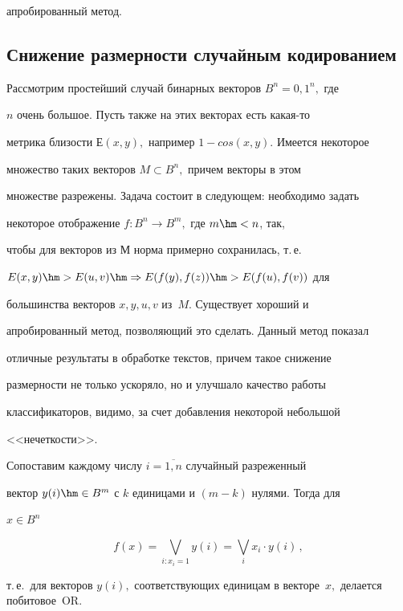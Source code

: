 апробированный метод.





\subsection{Снижение размерности случайным кодированием}


Рассмотрим простейший случай бинарных векторов $B^n={0,1}^n,$ где


$n$ очень большое. Пусть также на этих векторах есть какая-то


метрика близости $Е(x,y),$ например $1-cos(x,y).$ Имеется некоторое


множество таких векторов $M \subset B^n,$ причем векторы в этом


множестве разрежены.  Задача состоит в следующем: необходимо задать


некоторое отображение $f:B^n \to B^m,$ где $m\hm<n$, так,


чтобы для векторов из $М$ норма примерно сохранилась, т.\,е.\


$E(x,y)\hm>E(u,v) \hm\Rightarrow E(f(y),f(z))\hm>E(f(u),f(v))$ для


большинства векторов $x,y,u,v$ из~$M.$ Существует хороший и


апробированный метод, позволяющий это сделать. Данный метод показал


отличные результаты в обработке текстов, причем такое снижение


размерности не только ускоряло, но и улучшало качество работы


классификаторов, видимо, за счет добавления некоторой небольшой


<<нечеткости>>.





Сопоставим каждому числу $i=\overline{1,n}$ случайный разреженный


вектор $y(i)\hm\in B^m$ с $k$ единицами и $(m-k)$ нулями. Тогда для


$x \in B^n$ 


$$


f(x)=\bigvee\limits_{i:x_i=1}y(i)=\bigvee\limits_{i}x_i \cdot y(i)\,,


$$ 


т.\,е.\ для векторов $y(i),$ соответствующих единицам в векторе~$x,$ делается побитовое~OR.






